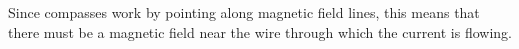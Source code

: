 
Since compasses work by pointing along magnetic field lines, this means that there must be a magnetic field near the wire through which the current is flowing.




